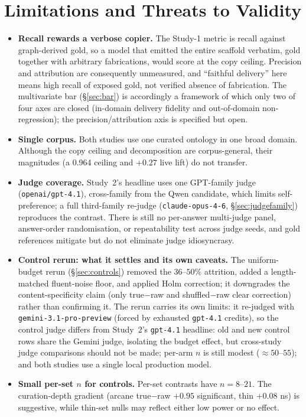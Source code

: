 \documentclass[10pt,twocolumn]{article}
\begin{document}
\section{Limitations and Threats to Validity}\label{sec:limits}
\begin{itemize}[topsep=2pt,itemsep=2pt,leftmargin=1.4em]
\item \textbf{Recall rewards a verbose copier.} The Study-1 metric is recall against graph-derived gold, so a model that emitted the entire scaffold verbatim, gold together with arbitrary fabrications, would score at the copy ceiling. Precision and attribution are consequently unmeasured, and ``faithful delivery'' here means high recall of exposed gold, not verified absence of fabrication. The multivariate bar (\S\ref{sec:bar}) is accordingly a framework of which only two of four axes are closed (in-domain delivery fidelity and out-of-domain non-regression); the precision/attribution axis is specified but open.
\item \textbf{Single corpus.} Both studies use one curated ontology in one broad domain. Although the copy ceiling and decomposition are corpus-general, their magnitudes (a 0.964 ceiling and $+0.27$ live lift) do not transfer.
\item \textbf{Judge coverage.} Study~2's headline uses one GPT-family judge
(\texttt{openai/gpt-4.1}), cross-family from the Qwen candidate, which limits self-preference; a full third-family re-judge (\texttt{claude-opus-4-6}, \S\ref{sec:judgefamily}) reproduces the contrast. There is still no per-answer multi-judge panel, answer-order randomisation, or repeatability test across judge seeds, and gold references mitigate but do not eliminate judge idiosyncrasy.
\item \textbf{Control rerun: what it settles and its own caveats.} The uniform-budget rerun (\S\ref{sec:controls}) removed the $36$--$50\%$ attrition, added a length-matched fluent-noise floor, and applied Holm correction; it downgrades the content-specificity claim (only true$-$raw and shuffled$-$raw clear correction) rather than confirming it. The rerun carries its own limits: it re-judged with \texttt{gemini-3.1-pro-preview} (forced by exhausted \texttt{gpt-4.1} credits), so the control judge differs from Study~2's \texttt{gpt-4.1} headline: old and new control rows share the Gemini judge, isolating the budget effect, but cross-study judge comparisons should not be made; per-arm $n$ is still modest ($\approx50$--$55$); and both studies use a single local production model.
\item \textbf{Small per-set $n$ for controls.} Per-set contrasts have $n=8$--$21$. The curation-depth gradient (arcane true$-$raw $+0.95$ significant, thin $+0.08$ ns) is suggestive, while thin-set nulls may reflect either low power or no effect.

\end{itemize}
\end{document}
